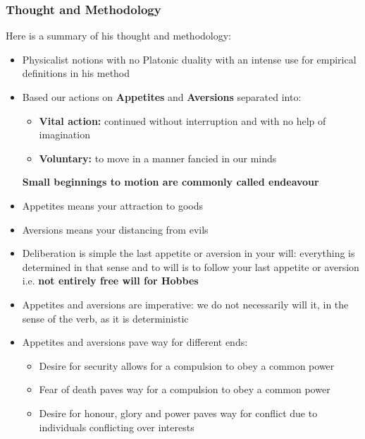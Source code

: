 \documentclass[12pt, letterpaper]{article}
\begin{document}
\subsubsection{Thought and Methodology}
Here is a summary of his thought and methodology:
\begin{itemize}
	\item Physicalist notions with no Platonic duality with an intense use for empirical definitions in his method
	\item Based our actions on \textbf{Appetites} and \textbf{Aversions} separated into:
		\begin{itemize}
			\item \textbf{Vital action:} continued without interruption and with no help of imagination
			\item \textbf{Voluntary:} to move in a manner fancied in our minds
		\end{itemize}
		\textbf{Small beginnings to motion are commonly called endeavour}
	\item Appetites means your attraction to goods
	\item Aversions means your distancing from evils
	\item Deliberation is simple the last appetite or aversion in your will: everything is determined in that sense and to will is to follow your last appetite or aversion i.e. \textbf{not entirely free will for Hobbes}
	\item Appetites and aversions are imperative: we do not necessarily will it, in the sense of the verb, as it is deterministic
	\item Appetites and aversions pave way for different ends:
		\begin{itemize}
			\item Desire for security allows for a compulsion to obey a common power
			\item Fear of death paves way for a compulsion to obey a common power
			\item Desire for honour, glory and power paves way for conflict due to individuals conflicting over interests
		\end{itemize}
\end{itemize}
\end{document}
